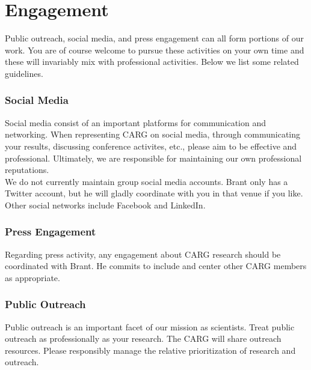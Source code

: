 \section{Engagement}
\label{sec:engagement}

Public outreach,
social media, and 
press engagement can
all form portions of our
work. You are of course 
welcome to pursue these
activities on your own
time and these will invariably
mix with professional 
activities. Below we 
list some related
guidelines.


\subsubsection{Social Media}
\label{sec:social_media}

Social media consist
of an important
platforms for communication
and networking.
When representing CARG
on social media, through
communicating your results,
discussing conference
activites, etc., please 
aim to be effective and
professional.
Ultimately, we are responsible
for maintaining our own
professional reputations.\\
\noindent
We do not currently maintain
group social media accounts.
Brant only has a Twitter 
account, but he will gladly
coordinate with you in
that venue if you like.
Other social networks
include Facebook and
LinkedIn.

\subsubsection{Press Engagement}
\label{sec:press_engagement}

Regarding press activity,
any engagement about
CARG research should be
coordinated with Brant.
He commits to include
and center other CARG 
members as appropriate.

\subsubsection{Public Outreach}
\label{sec:public_outreach}

Public outreach is an
important facet of our
mission as scientists.
Treat public outreach
as professionally as
your research. The
CARG will share
outreach resources.
Please responsibly manage
the relative prioritization
of
research and outreach.
